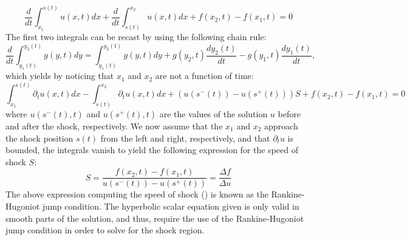 %
\begin{equation}\label{eq:rh2_sct1b}
\frac{d}{dt} \int_{x_1}^{s(t)} u(x,t) dx + \frac{d}{dt} \int_{s(t)}^{x_2} u(x,t) dx + f(x_2,t) - f(x_1,t) = 0
\end{equation}
% 
The first two integrals can be recast by using the following chain rule:
%
\begin{equation}\label{eq:rh3_sct1b}
\frac{d}{dt} \int_{y_1(t)}^{y_2(t)} g(y,t) dy =  \int_{y_1(t)}^{y_2(t)} g(y,t) dy + g(y_2,t) \frac{d y_2(t)}{dt} - g(y_1,t) \frac{d y_1(t)}{dt},
\end{equation}
% 
which yields by noticing that $x_1$ and $x_2$ are not a function of time:
%
\begin{equation}\label{eq:rh4_sct1b}
\int_{x_1}^{s(t)} \partial_t u(x,t) dx - \int_{s(t)}^{x_2} \partial_t u(x,t) dx + \left( u(s^-(t)) - u(s^+(t)) \right) S + f(x_2,t) - f(x_1,t) = 0
\end{equation}
%
where $u(s^-(t),t)$ and $u(s^+(t),t)$ are the values of the solution $u$ before and after the shock, respectively. We now assume that the $x_1$ and $x_2$ approach the shock position $s(t)$ from the left and right, respectively, and that $\partial_t u$ is bounded, the integrals vanish to yield the following expression for the speed of shock $S$:
%
\begin{equation}\label{eq:rh5_sct1b}
S = \frac{f(x_2,t) - f(x_1,t)}{u(s^-(t)) - u(s^+(t))} = \frac{\Delta f}{\Delta u}
\end{equation}
%
The above expression computing the speed of shock () is known as the Rankine-Hugoniot jump condition. The hyperbolic scalar equation given  is only valid in smooth parts of the solution, and thus, require the use of the Rankine-Hugoniot jump condition in order to solve for the shock region.   
